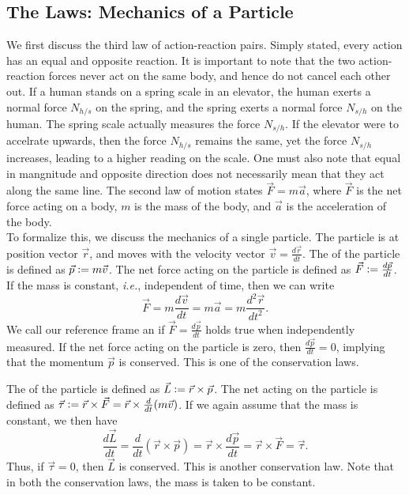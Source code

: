 \subsection{The Laws: Mechanics of a Particle}
We first discuss the third law of action-reaction pairs. Simply stated, every action has an equal and opposite reaction. It is important to note that the two action-reaction forces never act on the same body, and hence do not cancel each other out. If a human stands on a spring scale in an elevator, the human exerts a normal force $N_{h/s}$ on the spring, and the spring exerts a normal force $N_{s/h}$ on the human. The spring scale actually measures the force $N_{s/h}$. If the elevator were to accelrate upwards, then the force $N_{h/s}$ remains the same, yet the force $N_{s/h}$ increases, leading to a higher reading on the scale. One must also note that equal in mangnitude and opposite direction does not necessarily mean that they act along the same line. The second law of motion states $\vec{F} = m \vec{a}$, where $\vec{F}$ is the net force acting on a body, $m$ is the mass of the body, and $\vec{a}$ is the acceleration of the body.\\

To formalize this, we discuss the mechanics of a single particle. The particle is at position vector $\vec{r}$, and moves with the velocity vector $\vec{v} = \frac{d\vec{r}}{dt}$. The  of the particle is defined as $\vec{p} \vcentcolon= m \vec{v}$. The net force acting on the particle is defined as $\vec{F} \vcentcolon= \frac{d\vec{p}}{dt}$. If the mass is constant, \textit{i.e.}, independent of time, then we can write
\begin{equation}
    \vec{F} = m \frac{d\vec{v}}{dt} = m \vec{a} = m \frac{d^{2}\vec{r}}{dt^{2}}.
\end{equation}
We call our reference frame an  if $\vec{F} = \frac{d \vec{p}}{dt}$ holds true when independently measured. If the net force acting on the particle is zero, then $\frac{d\vec{p}}{dt} = 0$, implying that the momentum $\vec{p}$ is conserved. This is one of the conservation laws.

The  of the particle is defined as $\vec{L} \vcentcolon= \vec{r} \times \vec{p}$. The net  acting on the particle is defined as $\vec{\tau} \vcentcolon= \vec{r} \times \vec{F} = \vec{r} \times \frac{d}{dt}(m\vec{v})$. If we again assume that the mass is constant, we then have
\begin{equation}
    \frac{d\vec{L}}{dt} = \frac{d}{dt}(\vec{r} \times \vec{p}) = \vec{r} \times \frac{d\vec{p}}{dt} = \vec{r} \times \vec{F} = \vec{\tau}.
\end{equation}
Thus, if $\vec{\tau} = 0$, then $\vec{L}$ is conserved. This is another conservation law. Note that in both the conservation laws, the mass is taken to be constant.\\

